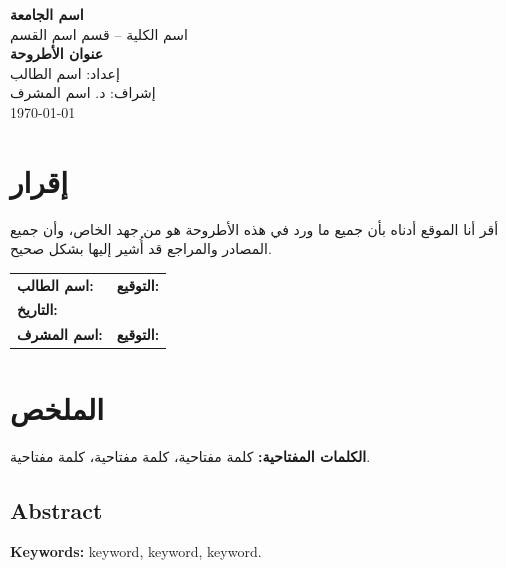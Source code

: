 \documentclass[12pt,oneside,a4paper]{book}
\begin{document}
\begin{titlepage}
    \centering
    \vspace*{2cm}
    {\Large\textbf{اسم الجامعة}}\\[0.5cm]
    {\large اسم الكلية -- قسم اسم القسم}\\[2cm]
    {\LARGE\textbf{عنوان الأطروحة}}\\[3cm]
    {\large إعداد: اسم الطالب}\\[1cm]
    {\large إشراف: د. اسم المشرف}\\[2cm]
    \vfill
    {\large \today}
\end{titlepage}

\frontmatter

\chapter*{إقرار}


\noindent
أقر أنا الموقع أدناه بأن جميع ما ورد في هذه الأطروحة هو من جهد الخاص، وأن جميع المصادر والمراجع قد أُشير إليها بشكل صحيح.

\vspace{2cm}

\noindent
\begin{tabular}{@{}p{7cm}p{7cm}@{}}
\textbf{اسم الطالب:} & \textbf{التوقيع:} \\[1.5cm]
\textbf{التاريخ:} & \\[1.5cm]
\textbf{اسم المشرف:} & \textbf{التوقيع:} \\
\end{tabular}

\chapter*{الملخص}


\noindent
\textbf{الكلمات المفتاحية:} كلمة مفتاحية، كلمة مفتاحية، كلمة مفتاحية.

\begin{english}
\chapter*{Abstract}


\noindent
\textbf{Keywords:} keyword, keyword, keyword.
\end{english}
\end{document}
